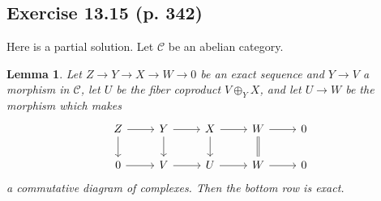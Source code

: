\documentclass[12pt]{article}
\newtheorem{lem}[thm]{Lemma}
\theoremstyle{remark}
\theoremstyle{definition}
\newcommand{\C}{\mathcal C}
\begin{document}

\subsection{Exercise 13.15 (p. 342)}

Here is a partial solution. Let $\C$ be an abelian category. 

\begin{lem}\label{738}
Let $Z\to Y\to X\to W\to0$ be an exact sequence and $Y\to V$ a morphism in $\C$, let $U$ be the fiber coproduct $V\oplus_YX$, and let $U\to W$ be the morphism which makes 
$$
\begin{tikzcd}
Z\ar{d}\ar{r}&Y\ar{d}\ar{r}&X\ar{d}\ar{r}&W\ar[equal]{d}\ar{r}&0\\ 
0\ar{r}&V\ar{r}&U\ar{r}&W\ar{r}&0
\end{tikzcd}
$$ 
a commutative diagram of complexes. Then the bottom row is exact.
\end{lem}
\end{document}
